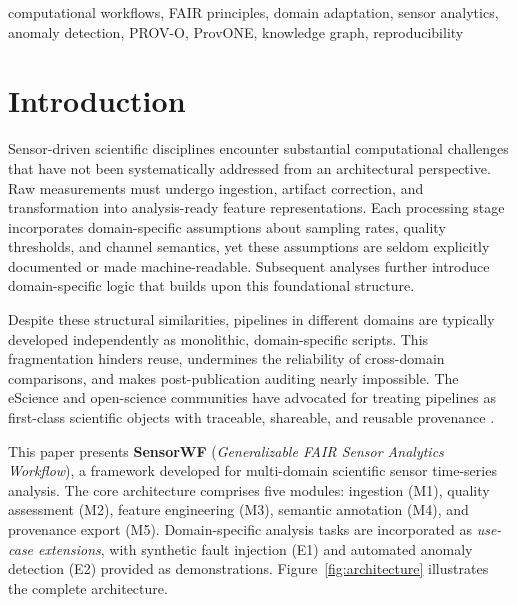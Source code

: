 \documentclass[conference]{IEEEtran}
\begin{document}
\begin{IEEEkeywords}
computational workflows, FAIR principles, domain adaptation, sensor analytics,
anomaly detection, PROV-O, ProvONE, knowledge graph, reproducibility
\end{IEEEkeywords}


\section{Introduction}


Sensor-driven scientific disciplines encounter substantial computational challenges that have not been systematically addressed from an architectural perspective. Raw measurements must undergo ingestion, artifact correction, and transformation into analysis-ready feature representations. Each processing stage incorporates domain-specific assumptions about sampling rates, quality thresholds, and channel semantics, yet these assumptions are seldom explicitly documented or made machine-readable. Subsequent analyses further introduce domain-specific logic that builds upon this foundational structure.

Despite these structural similarities, pipelines in different domains are typically developed independently as monolithic, domain-specific scripts. This fragmentation hinders reuse, undermines the reliability of cross-domain comparisons, and makes post-publication auditing nearly impossible. The eScience and open-science communities have advocated for treating pipelines as first-class scientific objects with traceable, shareable, and reusable provenance \cite{wilkinson2016fair,garijo2022fair}.

This paper presents \textbf{SensorWF} (\emph{Generalizable FAIR Sensor Analytics Workflow}), a framework developed for multi-domain scientific sensor time-series analysis. The core architecture comprises five modules: ingestion (M1), quality assessment (M2), feature engineering (M3), semantic annotation (M4), and provenance export (M5). Domain-specific analysis tasks are incorporated as \emph{use-case extensions}, with synthetic fault injection (E1) and automated anomaly detection (E2) provided as demonstrations. Figure~\ref{fig:architecture} illustrates the complete architecture.
\end{document}
